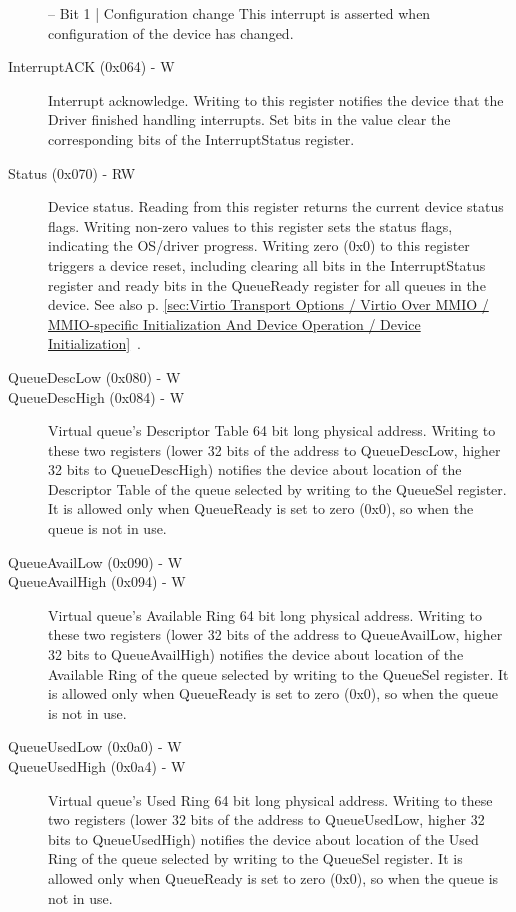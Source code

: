 \begin{description}
  – Bit 1 | Configuration change
    This interrupt is asserted when configuration of the device has
    changed.

\item[InterruptACK (0x064) - W]
  Interrupt acknowledge.
  Writing to this register notifies the device that the Driver
  finished handling interrupts. Set bits in the value clear
  the corresponding bits of the InterruptStatus register.

\item[Status (0x070) - RW]
  Device status.
  Reading from this register returns the current device status
  flags.
  Writing non-zero values to this register sets the status flags,
  indicating the OS/driver progress. Writing zero (0x0) to this
  register triggers a device reset, including clearing all
  bits in the InterruptStatus register and ready bits in the
  QueueReady register for all queues in the device.
  See also p. \ref{sec:Virtio Transport Options / Virtio Over MMIO / MMIO-specific Initialization And Device Operation / Device Initialization}~.

\item[QueueDescLow (0x080) - W]
\item[QueueDescHigh (0x084) - W]
  Virtual queue's Descriptor Table 64 bit long physical address.
  Writing to these two registers (lower 32 bits of the address
  to QueueDescLow, higher 32 bits to QueueDescHigh) notifies
  the device about location of the Descriptor Table of the queue
  selected by writing to the QueueSel register. It is allowed
  only when QueueReady is set to zero (0x0), so when the queue
  is not in use.

\item[QueueAvailLow (0x090) - W]
\item[QueueAvailHigh (0x094) - W]
  Virtual queue's Available Ring 64 bit long physical address.
  Writing to these two registers (lower 32 bits of the address
  to QueueAvailLow, higher 32 bits to QueueAvailHigh) notifies
  the device about location of the Available Ring of the queue
  selected by writing to the QueueSel register. It is allowed
  only when QueueReady is set to zero (0x0), so when the queue
  is not in use.

\item[QueueUsedLow (0x0a0) - W]
\item[QueueUsedHigh (0x0a4) - W]
  Virtual queue's Used Ring 64 bit long physical address.
  Writing to these two registers (lower 32 bits of the address
  to QueueUsedLow, higher 32 bits to QueueUsedHigh) notifies
  the device about location of the Used Ring of the queue
  selected by writing to the QueueSel register. It is allowed
  only when QueueReady is set to zero (0x0), so when the queue
  is not in use.


\end{description}
